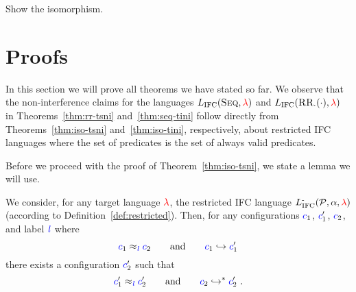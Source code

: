 \documentclass{sigplanconf}
\newcommand{\Varid}[1]{\mathit{#1}}
\newcommand{\Red}[1]{{\color{red} #1}}
\begin{document}
\Red{Show the isomorphism.}


\section{Proofs}
\label{sec:proofs}

In this section we will prove all theorems we have stated so far.
We observe that the non-interference claims for the languages
\ensuremath{L_\text{IFC}(\textsc{Seq},\Red{\lambda})} and \ensuremath{L_\text{IFC}(\textsc{RR}_{{\tiny\mathrm{\cdot }}}(\cdot ),\Red{\lambda})}
in Theorems~\ref{thm:rr-tsni} and~\ref{thm:seq-tini} follow directly
from Theorems~\ref{thm:iso-tsni} and~\ref{thm:iso-tini},
respectively, about restricted IFC languages where the set
of predicates is the set of always valid predicates.

Before we proceed with the proof of Theorem~\ref{thm:iso-tsni},
we state a lemma we will use.

\begin{lemma}
  \label{lemma:rr-tsni-general}
  We consider, for any target language \ensuremath{\Red{\lambda}},
  the restricted IFC language \ensuremath{L_\text{IFC}^{\text{-}}(\mathcal{P},\alpha,\Red{\lambda})}
  (according to Definition~\ref{def:restricted}).
  Then,
  for any configurations \ensuremath{\ifc{c}_{1}}, \ensuremath{\ifc{c}_{1}'}, \ensuremath{\ifc{c}_{2}}, and label \ensuremath{\ifc{\Varid{l}}} where
  \begin{equation} \label{eq:tsni-lemma-lhs}
  \ensuremath{\ifc{c}_{1}} \approx_{\ensuremath{\ifc{\Varid{l}}}} \ensuremath{\ifc{c}_{2}}
  \qquad \text{and} \qquad
  \ensuremath{\ifc{c}_{1}} \ensuremath{\hookrightarrow} \ensuremath{\ifc{c}_{1}'}
  \end{equation}
  there exists a configuration \ensuremath{\ifc{c}_{2}'} such that
  \begin{equation} \label{eq:tsni-lemma-rhs}
  \ensuremath{\ifc{c}_{1}'} \approx_{\ensuremath{\ifc{\Varid{l}}}} \ensuremath{\ifc{c}_{2}'}
  \qquad \text{and} \qquad
  \ensuremath{\ifc{c}_{2}} \ensuremath{\hookrightarrow}^* \ensuremath{\ifc{c}_{2}'}
  \ \text{.}
  \end{equation}
\end{lemma}
\end{document}

